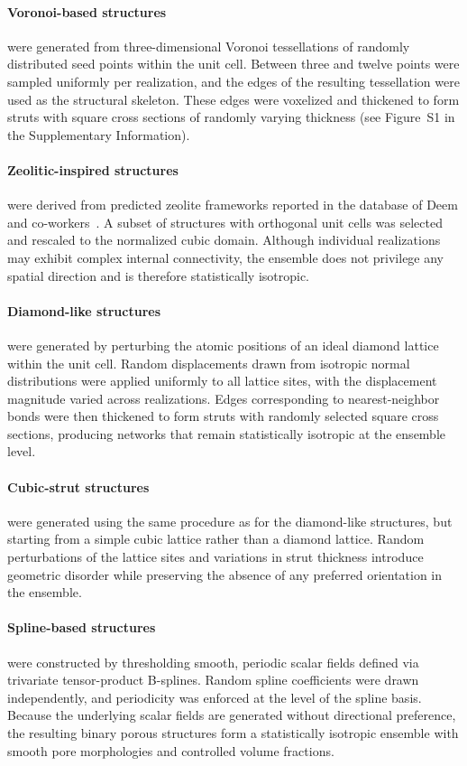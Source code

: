 \documentclass[sn-mathphys,Numbered]{sn-jnl}
\theoremstyle{definition}
\begin{document}
\paragraph{Voronoi-based structures} were generated from three-dimensional Voronoi
tessellations of randomly distributed seed points within the unit cell.
Between three and twelve points were sampled uniformly per realization, and the
edges of the resulting tessellation were used as the structural skeleton.
These edges were voxelized and thickened to form struts with square cross
sections of randomly varying thickness (see Figure~S1 in the Supplementary Information).

\paragraph{Zeolitic-inspired structures} were derived from predicted zeolite frameworks reported in
the database of Deem and co-workers~\cite{C0CP02255A,deem2023pcod}.
A subset of structures with orthogonal unit cells was selected and rescaled to
the normalized cubic domain.
Although individual realizations may exhibit complex internal connectivity, the
ensemble does not privilege any spatial direction and is therefore
statistically isotropic.

\paragraph{Diamond-like structures} were generated by perturbing the atomic positions of an
ideal diamond lattice within the unit cell.
Random displacements drawn from isotropic normal distributions were applied
uniformly to all lattice sites, with the displacement magnitude varied across
realizations.
Edges corresponding to nearest-neighbor bonds were then thickened to form struts
with randomly selected square cross sections, producing networks that remain
statistically isotropic at the ensemble level.

\paragraph{Cubic-strut structures} were generated using the same procedure as for the
diamond-like structures, but starting from a simple cubic lattice rather than a
diamond lattice.
Random perturbations of the lattice sites and variations in strut thickness
introduce geometric disorder while preserving the absence of any preferred
orientation in the ensemble.

\paragraph{Spline-based structures} were constructed by thresholding smooth, periodic scalar
fields defined via trivariate tensor-product B-splines.
Random spline coefficients were drawn independently, and periodicity was
enforced at the level of the spline basis.
Because the underlying scalar fields are generated without directional
preference, the resulting binary porous structures form a statistically
isotropic ensemble with smooth pore morphologies and controlled volume
fractions.
\end{document}
